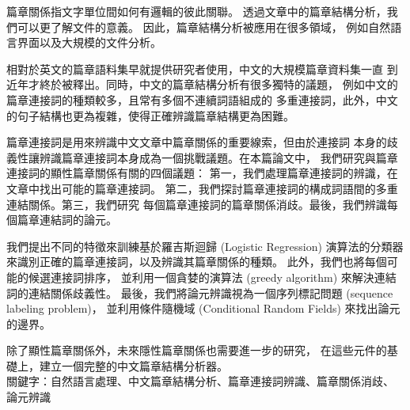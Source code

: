 \begin{abstractzh}

篇章關係指文字單位間如何有邏輯的彼此關聯。
透過文章中的篇章結構分析，我們可以更了解文件的意義。
因此，篇章結構分析被應用在很多領域，
例如自然語言界面以及大規模的文件分析。

相對於英文的篇章語料集早就提供研究者使用，中文的大規模篇章資料集一直
到近年才終於被釋出。同時，中文的篇章結構分析有很多獨特的議題，
例如中文的篇章連接詞的種類較多，且常有多個不連續詞語組成的
多重連接詞，此外，中文的句子結構也更為複雜，使得正確辨識篇章結構更為困難。

篇章連接詞是用來辨識中文文章中篇章關係的重要線索，但由於連接詞
本身的歧義性讓辨識篇章連接詞本身成為一個挑戰議題。在本篇論文中，
我們研究與篇章連接詞的顯性篇章關係有關的四個議題：
第一，我們處理篇章連接詞的辨識，在文章中找出可能的篇章連接詞。
第二，我們探討篇章連接詞的構成詞語間的多重連結關係。第三，我們研究
每個篇章連接詞的篇章關係消歧。最後，我們辨識每個篇章連結詞的論元。

我們提出不同的特徵來訓練基於羅吉斯迴歸 (Logistic Regression)
演算法的分類器來識別正確的篇章連接詞，以及辨識其篇章關係的種類。
此外，我們也將每個可能的候選連接詞排序，
並利用一個貪婪的演算法 (greedy algorithm) 來解決連結詞的連結關係歧義性。
最後，我們將論元辨識視為一個序列標記問題 (sequence labeling problem)，
並利用條件隨機域 (Conditional Random Fields) 來找出論元的邊界。

除了顯性篇章關係外，未來隱性篇章關係也需要進一步的研究，
在這些元件的基礎上，建立一個完整的中文篇章結構分析器。 \\

\noindent
關鍵字：自然語言處理、中文篇章結構分析、篇章連接詞辨識、篇章關係消歧、
論元辨識

\end{abstractzh}

